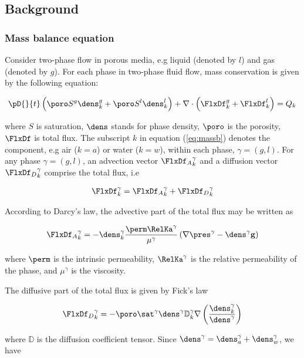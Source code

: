 \subsection{Background}
\subsubsection*{Mass balance equation}
Consider two-phase flow in porous media, e.g liquid (denoted by $l$) and gas (denoted by $g$). For each phase in two-phase fluid flow, mass conservation is given by the following equation:

\begin{align}
\pD{}{t}\left(\poro S^g\dens_k^g+\poro S^l\dens_k^l\right)+\nabla \cdot \left( \FlxDf_k^g+\FlxDf_k^l\right)=Q_k
\label{eq:massb}
\end{align}

where $S$ is saturation, $\dens$ stands for phase density, $\poro$ is the porosity, $\FlxDf$ is total flux. The subscript $k$ in equation (\ref{eq:massb}) denotes the component, e.g air ($k=a$) or water ($k=w$), within each phase, $\gamma=(g,l)$. For any phase $\gamma=(g,l)$, an advection vector ${{\FlxDf}_A}_k^{\gamma}$ and a diffusion vector  ${{\FlxDf}_D}_k^{\gamma}$ comprise the total flux, i.e

\begin{align}
\FlxDf_k^{\gamma}={{\FlxDf}_A}_k^{\gamma}+{{\FlxDf}_D}_k^{\gamma}
\label{eq:tflx}
\end{align}

According to Darcy's law, the advective part of the total flux may be written as

\begin{align}
{{\FlxDf}_A}_k^{\gamma}=-\dens_k^{\gamma}\dfrac{\perm \RelKa^{\gamma}}{\mu^{\gamma}}\left(\nabla \pres^{\gamma}-\dens^{\gamma} \mathbf g\right)
\label{eq:flx_dc}
\end{align}

where $\perm$ is the intrinsic permeability, $\RelKa^{\gamma}$ is the relative permeability of the phase, and $\mu^{\gamma}$ is the viscosity.

The diffusive part of the total flux is given by Fick's law

\begin{align}
{{\FlxDf}_D}_k^{\gamma}=-\poro \sat^{\gamma}  \dens^{\gamma} {\mathbb D}_k^{\gamma} \nabla \left(\dfrac{\dens_k^{\gamma}}{\dens^{\gamma}}\right)
\label{eq:flx_fk}
\end{align}

where $\mathbb D$ is the diffusion coefficient tensor. Since $\dens^{\gamma} = \dens_a^{\gamma}+\dens_w^{\gamma}$, we have

